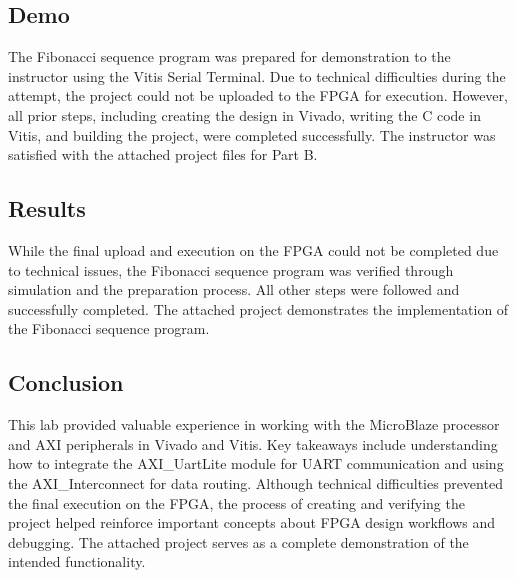 \subsection{Demo}
The Fibonacci sequence program was prepared for demonstration to the instructor using the Vitis Serial Terminal. Due to technical difficulties during the attempt, the project could not be uploaded to the FPGA for execution. However, all prior steps, including creating the design in Vivado, writing the C code in Vitis, and building the project, were completed successfully. The instructor was satisfied with the attached project files for Part B.

\subsection{Results}
While the final upload and execution on the FPGA could not be completed due to technical issues, the Fibonacci sequence program was verified through simulation and the preparation process. All other steps were followed and successfully completed. The attached project demonstrates the implementation of the Fibonacci sequence program.

\subsection{Conclusion}
This lab provided valuable experience in working with the MicroBlaze processor and AXI peripherals in Vivado and Vitis. Key takeaways include understanding how to integrate the AXI\_UartLite module for UART communication and using the AXI\_Interconnect for data routing. Although technical difficulties prevented the final execution on the FPGA, the process of creating and verifying the project helped reinforce important concepts about FPGA design workflows and debugging. The attached project serves as a complete demonstration of the intended functionality.
